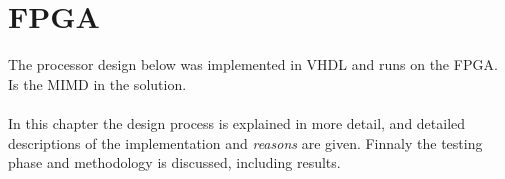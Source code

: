 \chapter{FPGA}\label{chapter:fpga}

The processor design below was implemented in VHDL and runs on the FPGA. Is the MIMD in the solution.\\
\\
In this chapter the design process is explained in more detail, and detailed descriptions of the implementation and \emph{reasons} are given. Finnaly the testing phase and methodology is discussed, including results.
%






